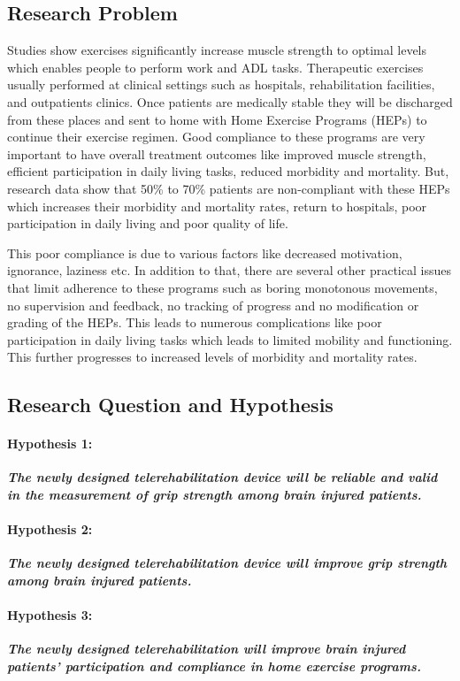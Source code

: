 \documentclass[12pt]{article}
\begin{document}
\subsection{Research Problem}
Studies show exercises significantly increase muscle strength to optimal levels which enables people to perform work and ADL tasks. Therapeutic exercises usually performed at clinical settings such as hospitals, rehabilitation facilities, and outpatients clinics. Once patients are medically stable they will be discharged from these places and sent to home with Home Exercise Programs (HEPs) to continue their exercise regimen. Good compliance to these programs are very important to have overall treatment outcomes like improved muscle strength, efficient participation in daily living tasks, reduced morbidity and  mortality. But, research data show that 50\% to 70\% patients are non-compliant with these HEPs \cite{bgwag13} which increases their morbidity and mortality rates, return to hospitals, poor participation in daily living and poor quality of life. 


This poor compliance is due to various factors like decreased motivation, ignorance, laziness etc.  In addition to that, there are several other practical issues that limit adherence to these programs such as boring monotonous movements, no supervision and feedback, no tracking of progress and  no modification or grading of the HEPs. This leads to numerous complications like poor participation in daily living tasks which leads to limited mobility and functioning. This further progresses to increased levels of morbidity and mortality rates.
\subsection{Research Question and Hypothesis}

\paragraph{Hypothesis 1:}
 \textit {\textbf{The newly designed telerehabilitation device will  be reliable and valid in the measurement of grip strength among brain injured patients.}}
\paragraph{Hypothesis 2:}
 \textit {\textbf{The newly designed telerehabilitation device will improve grip strength among brain injured patients.}} 
 
 \paragraph{Hypothesis 3:}
 \textit{\textbf{The newly designed telerehabilitation will improve brain injured patients' participation and compliance in home exercise programs.}} 
\end{document}

